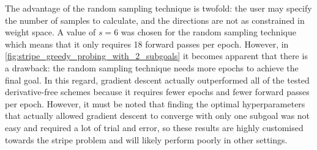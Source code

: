 The advantage of the random sampling technique is twofold: the user may specify the number of samples to calculate, and the directions are not as constrained in weight space.
A value of $s=6$ was chosen for the random sampling technique which means that it only requires 18 forward passes per epoch.
However, in \ref{fig:stripe_greedy_probing_with_2_subgoals} it becomes apparent that there is a drawback: the random sampling technique needs more epochs to achieve the final goal.
In this regard, gradient descent actually outperformed all of the tested derivative-free schemes because it requires fewer epochs and fewer forward passes per epoch.
However, it must be noted that finding the optimal hyperparameters that actually allowed gradient descent to converge with only one subgoal was not easy and required a lot of trial and error, so these results are highly customised towards the stripe problem and will likely perform poorly in other settings.

